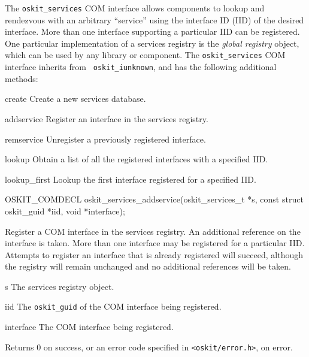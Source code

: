 %
% 
%
\label{register}

\label{oskit-services}

The \texttt{oskit_services} COM interface allows components to lookup and
rendezvous with an arbitrary ``service'' using the interface ID (IID) of the
desired interface. More than one interface supporting a particular IID can
be registered. One particular implementation of a services registry is the
\emph{global registry} object, which can be used by any library or
component. The {\tt oskit_services} COM interface inherits from {\tt
oskit_iunknown}, and has the following additional methods:
\begin{icsymlist}
\item[create]
	Create a new services database.
\item[addservice]
	Register an interface in the services registry.
\item[remservice]
	Unregister a previously registered interface.
\item[lookup]
	Obtain a list of all the registered interfaces with a specified IID.
\item[lookup_first]
	Lookup the first interface registered for a specified IID.
\end{icsymlist}

\begin{apisyn}

	\funcproto OSKIT_COMDECL
	oskit_services_addservice(oskit_services_t *s,
				  const struct oskit_guid *iid,
				  void *interface);
\end{apisyn}
\begin{apidesc}
	Register a COM interface in the services registry. An additional
	reference on the interface is taken. More than one interface may be
	registered for a particular IID\@. Attempts to register an interface
	that is already registered will succeed, although the registry will
	remain unchanged and no additional references will be taken.
\end{apidesc}
\begin{apiparm}
	\item[s]
		The services registry object.
	\item[iid]
		The {\tt oskit_guid} of the COM interface being registered.
	\item[interface]
		The COM interface being registered.
\end{apiparm}
\begin{apiret}
	Returns 0 on success, or an error code specified in
	{\tt <oskit/error.h>}, on error.
\end{apiret}

